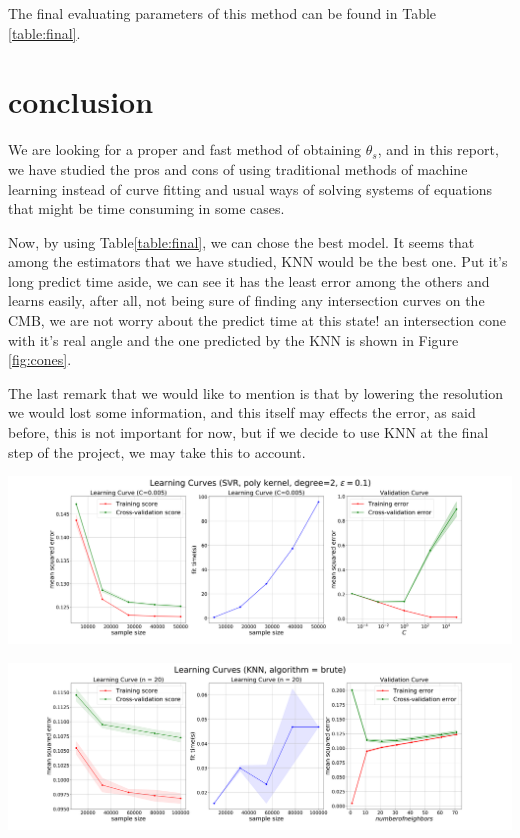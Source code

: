 \documentclass[a4paper,12pt]{article}
\begin{document}
\begin{multicols}{2}
The final evaluating parameters of this method can be found in Table \ref{table:final}.
\section{conclusion}
We are looking for a proper and fast method of obtaining $\theta_s$, and in this report, we have studied the pros and cons of using traditional methods of machine learning instead of curve fitting and usual ways of solving systems of equations that might be time consuming in some cases.

Now, by using Table\ref{table:final}, we can chose the best model. It seems that among the estimators that we have studied, KNN would be the best one. Put it's long predict time aside, we can see it has the least error among the others and learns easily, after all, not being sure of finding any intersection curves on the CMB, we are not worry about the predict time at this state! an intersection cone with it's real angle and the one predicted by the KNN is shown in Figure \ref{fig:cones}.

The last remark that we would like to mention is that by lowering the resolution we would lost some information, and this itself may effects the error, as said before, this is not important for now, but if we decide to use KNN at the final step of the project, we may take this to account.


\end{multicols}

\includegraphics[width=1\textwidth]{svr-final.png}
\label{fig:svr}

\includegraphics[width=1\textwidth]{knn-final.png}
\label{fig:knn}
\end{document}

